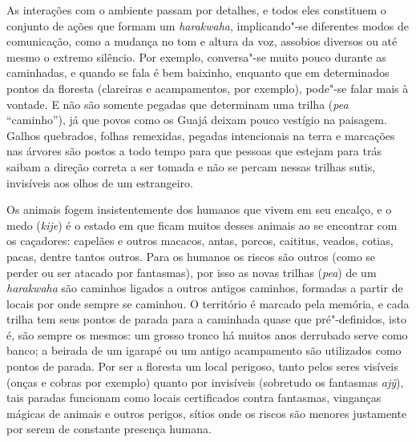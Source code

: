 As interações com o ambiente passam por detalhes, e todos eles
constituem o conjunto de ações que formam um \emph{harakwaha},
implicando"-se diferentes modos de comunicação, como a mudança no tom e
altura da voz, assobios diversos ou até mesmo o extremo silêncio. Por
exemplo, conversa"-se muito pouco durante as caminhadas, e quando se fala
é bem baixinho, enquanto que em determinados pontos da floresta
(clareiras e acampamentos, por exemplo), pode"-se falar mais à vontade. E
não são somente pegadas que determinam uma trilha (\emph{pea}
``caminho''), já que povos como os Guajá deixam pouco vestígio na
paisagem. Galhos quebrados, folhas remexidas, pegadas intencionais na
terra e marcações nas árvores são postos a todo tempo para que pessoas
que estejam para trás saibam a direção correta a ser tomada e não se
percam nessas trilhas sutis, invisíveis aos olhos de um estrangeiro.

Os animais fogem insistentemente dos humanos que vivem em seu encalço, e
o medo (\emph{kije}) é o estado em que ficam muitos desses animais ao se
encontrar com os caçadores: capelães e outros macacos, antas, porcos,
caititus, veados, cotias, pacas, dentre tantos outros. Para os humanos
os riscos são outros (como se perder ou ser atacado por fantasmas), por
isso as novas trilhas (\emph{pea}) de um \emph{harakwaha} são caminhos
ligados a outros antigos caminhos, formadas a partir de locais por onde
sempre se caminhou. O território é marcado pela memória, e cada trilha
tem seus pontos de parada para a caminhada quase que pré"-definidos, isto
é, são sempre os mesmos: um grosso tronco há muitos anos derrubado serve
como banco; a beirada de um igarapé ou um antigo acampamento são
utilizados como pontos de parada. Por ser a floresta um local perigoso,
tanto pelos seres visíveis (onças e cobras por exemplo) quanto por
invisíveis (sobretudo os fantasmas \emph{ajỹ}), tais paradas funcionam
como locais certificados contra fantasmas, vinganças mágicas de animais
e outros perigos, sítios onde os riscos são menores justamente por serem
de constante presença humana.


